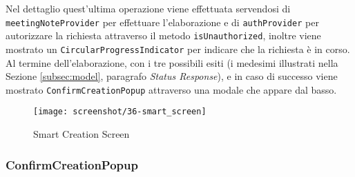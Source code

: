 Nel dettaglio quest'ultima operazione viene effettuata servendosi di \lstinline{meetingNoteProvider} per effettuare l'elaborazione e di \lstinline{authProvider} per autorizzare la richiesta attraverso il metodo \lstinline{isUnauthorized}, inoltre viene mostrato un \lstinline{CircularProgressIndicator} \cite{site:circular-progress-indicator} per indicare che la richiesta è in corso. \\
Al termine dell'elaborazione, con i tre possibili esiti (i medesimi illustrati nella Sezione \ref{subsec:model}, paragrafo \emph{Status Response}), e in caso di successo viene mostrato \lstinline{ConfirmCreationPopup} attraverso una modale che appare dal basso.

\begin{figure}[!h] 
    \centering 
    \texttt{[image: screenshot/36-smart\_screen]} 
    \caption{Smart Creation Screen}
    \label{fig:smart-screen}
\end{figure}

\subsubsection*{ConfirmCreationPopup}
\label{subsubsec:confirm-creation-popup}

